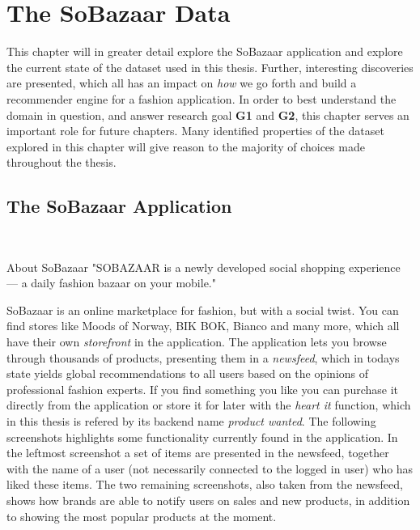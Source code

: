 
\chapter{The SoBazaar Data}
\label{chap:thesobazaardata}
\minitoc

This chapter will in greater detail explore the SoBazaar application and
explore the current state of the dataset used in this thesis. Further,
interesting discoveries are presented, which all has an impact on \textit{how}
we go forth and build a recommender engine for a fashion application. In order
to best understand the domain in question, and answer research goal \textbf{G1}
and \textbf{G2}, this chapter serves an important role for future chapters.
Many identified properties of the dataset explored in this chapter will give
reason to the majority of choices made throughout the thesis.

\clearpage
\section{The SoBazaar Application}\mbox{}\\
\label{sec:sobazaar-data}


\begin{chapquote}[30pt]{About SoBazaar}
  "SOBAZAAR is a newly developed social shopping experience --- a daily fashion bazaar on your mobile."
\end{chapquote}

SoBazaar is an online marketplace for fashion, but with a social twist. You can
find stores like Moods of Norway, BIK BOK, Bianco and many more, which all have
their own \textit{storefront} in the application. The application lets you
browse through thousands of products, presenting them in a \textit{newsfeed},
which in todays state yields global recommendations to all users based on the
opinions of professional fashion experts. If you find something you like you
can purchase it directly from the application or store it for later with the
\emph{heart it} function, which in this thesis is refered by its backend name
\textit{product wanted}. The following screenshots highlights some
functionality currently found in the application. In the leftmost screenshot a
set of items are presented in the newsfeed, together with the name of a user
(not necessarily connected to the logged in user) who has liked these items.
The two remaining screenshots, also taken from the newsfeed, shows how brands
are able to notify users on sales and new products, in addition to showing the
most popular products at the moment.

